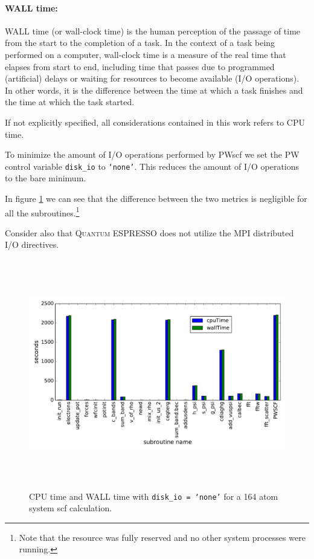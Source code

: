 \documentclass[a4paper,12pt]{article}
\newcommand\QE{\textsc{Quantum} ESPRESSO }
\begin{document}
\paragraph{WALL time: } WALL time (or wall-clock time) is the human perception of the passage of time from the start to the completion of a task. 
In the context of a task being performed on a computer, wall-clock time is a measure of the real time that elapses from start to end, including time that passes due to programmed (artificial) delays or waiting for resources to become available (I/O operations). 
In other words, it is the difference between the time at which a task finishes and the time at which the task started.

If not explicitly specified, all considerations contained in this work refers to CPU time.

To minimize the amount of I/O operations performed by PWscf we set the PW control variable \texttt{disk\_io} to \texttt{`none'}\cite{PWinput}.
This reduces the amount of I/O operations to the bare minimum.

In figure \ref{fig:cpuwalltime} we can see that the difference between the two metrics is negligible for all the subroutines.\footnote{Note that the resource was fully reserved and no other system processes were running.}

Consider also that \QE does not utilize the MPI distributed I/O directives.

\begin{figure}[hhh!]
\begin{center}
	\includegraphics[width=\linewidth ,height=10cm]{cpuwalltime.pdf}	
	\caption{CPU time and WALL time with \texttt{disk\_io = `none'} for a 164 atom system scf calculation.}
	\label{fig:cpuwalltime}
\end{center}
\end{figure}
\end{document}
